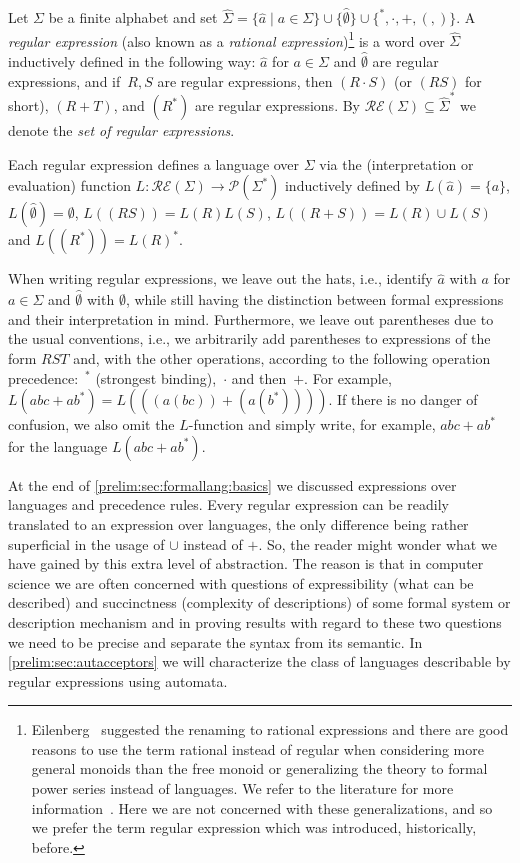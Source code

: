 \label{def:RegSigma}
Let $\Sigma$ be a finite alphabet and set $\hat \Sigma = \{ \hat a \mid a \in \Sigma\}
\cup \{ \hat\emptyset \} \cup \{  ^*, \cdot, +, (, ) \}$.
A \emph{regular expression} (also known as a \emph{rational expression})\footnote{
	Eilenberg~\cite{Eilenberg1974}
	suggested the renaming to rational expressions 
	and there are good reasons to 
	use the term rational
	instead of regular when considering more general monoids
	than the free monoid or generalizing the theory to formal power series instead of languages.
	We refer to the literature for more information~\cite{Eilenberg1974,Eilenberg1976}.	
	Here we are not concerned with these generalizations, and so we prefer
	the term regular expression which was introduced, historically,
	before.}
is a word over $\hat \Sigma$
inductively defined in the following way:
$\hat a$ for $a \in \Sigma$
and $\hat{\emptyset}$ are regular expressions, and if~$R, S$ are regular expressions, then $(R\cdot S)$ (or $(RS)$ for short), $(R + T)$, and $(R^*)$
are regular expressions. 	
By $\mathcal{RE}(\Sigma) \subseteq \hat{\Sigma}^*$
we denote the \emph{set of regular expressions}.

\label{def:Lregex}
\label{def:language_reg_ex}
Each regular expression defines a language over $\Sigma$ 
via the  
(interpretation or evaluation) function 
$L \colon \mathcal{RE}(\Sigma) \to \mathcal P(\Sigma^*)$ 
inductively defined by
$L(\hat a) = \{a\}$, $L(\hat \emptyset) = \emptyset$, $L((RS)) = L(R)L(S)$, 
$L((R+S)) = L(R) \cup L(S)$ and $L((R^*)) = L(R)^*$.

When writing regular expressions, we leave out the hats, i.e., identify $\hat a$ with $a$ for $a \in \Sigma$ 
and $\hat \emptyset$ with $\emptyset$, while still having the distinction between formal expressions
and their interpretation in mind.
Furthermore, we leave out parentheses due to the usual conventions,
i.e., we arbitrarily add parentheses to expressions of the form $RST$ and, with the other operations, according to the following
operation precedence:~$^\ast$ (strongest binding),~$\cdot$ and then~$+$.
For example, $L(abc + ab^*) = L(((a(bc)) + (a(b^*))))$. If there is no danger of confusion, we also omit the $L$-function
and simply write, for example, $abc + ab^*$ for the language $L(abc + ab^*)$.

At the end of \cref{prelim:sec:formallang:basics}
we discussed expressions over languages and precedence rules.
Every regular expression can be readily translated
to an expression over languages, the only difference
being rather superficial in the usage of $\cup$
instead of $+$. So, the reader might wonder what we have gained
by this extra level of abstraction.
The reason is that in computer science we are often concerned with questions of expressibility (what can be described)
and succinctness (complexity of descriptions)
of some formal system or description mechanism and in proving results with regard
to these two questions we need to be precise and separate the syntax from its semantic.
In \cref{prelim:sec:autacceptors} 
we will characterize the class of languages describable by regular expressions
using automata.